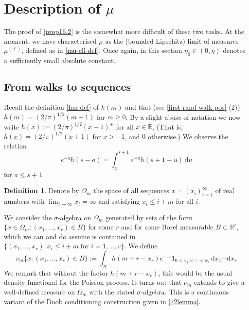\documentclass[11pt,reqno]{amsart}
\numberwithin{equation}{section}
\theoremstyle{definition}
\newtheorem{definition}[theorem]{Definition}
\theoremstyle{remark}
\renewcommand{\le}{\leqslant}
\renewcommand{\ge}{\geqslant}
\newcommand\R{\mathbb{R}}
\begin{document}
\section{Description of \texorpdfstring{$\mu$}{}}\label{sec16}

The proof of \cref{prop16.2} is the somewhat more difficult of these two tasks. At the moment, we have characterised $\mu$ as the (bounded Lipschitz) limit of measures $\mu^{(\ell)}$, defined as in \cref{mu-ell-def}. Once again, in this section $\eta_0 \in (0,\eta)$ denotes a sufficiently small absolute constant.



\subsection{From walks to sequences}
Recall the definition \cref{hm-def} of $h(m)$ and that (see \cref{first-rand-walk-pos} (2)) $h(m) = (2/\pi)^{1/2} (m + 1)$ for $m \ge 0$. By a slight abuse of notation we now write $h(x) := (2/\pi)^{1/2}(x + 1)^+$ for all $x \in \R$. (That is, $h(x) = (2/\pi)^{1/2}(x + 1)$ for $x > -1$, and $0$ otherwise.)
We observe the relation
\begin{equation}\label{recur-relat-2} e^{-a} h(s - a) = \int^{s+1}_a e^{-u} h(s + 1 - u) \, \mathrm{d}u\end{equation}
for $a \le s+1$.

\begin{definition}
Denote by $\Omega_{m}$ the space of all sequences $x = (x_i)_{i = 1}^{\infty}$ of real numbers with $\lim_{i \rightarrow \infty} x_i = \infty$ and satisfying $x_i \le i + m$ for all $i$. 
\end{definition}
We consider the $\sigma$-algebra on $\Omega_{m}$ generated by sets of the form $\{ x\in \Omega_{m}: (x_1,\dots, x_r) \in B\}$ for some $r$ and for some Borel measurable $B \subset \R^r$, which we can and do assume is contained in $\{ (x_1,\dots, x_r) : x_i \le i + m \; \mbox{for $i = 1,\dots, r$}\}$. We define
\begin{equation}\label{nu-m-def} \nu_m \{ x : (x_1,\dots, x_r) \in B\} := \int_{B} h(m + r - x_r) e^{-x_r} 1_{0 < x_1 < \cdots < x_r}\, \mathrm{d}x_1 \cdots \mathrm{d}x_r \end{equation} 
We remark that without the factor $h(m + r - x_r)$, this would be the usual density functional for the Poisson process. It turns out that $\nu_m$ extends to give a well-defined measure on $\Omega_m$ with the stated $\sigma$-algebra. This is a continuous variant of the Doob conditioning construction given in \cref{72lemma}.
\end{document}
